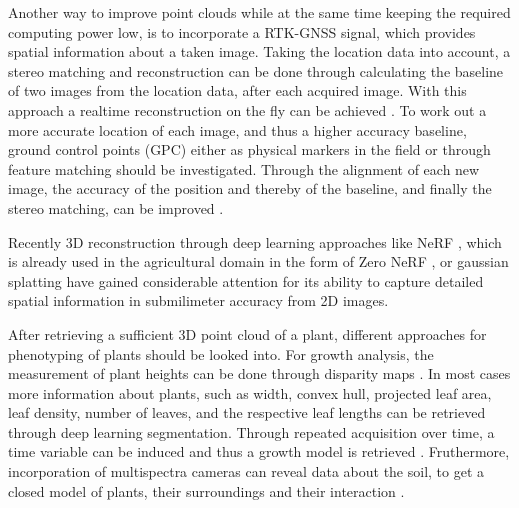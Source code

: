 \documentclass[conference,]{IEEEtran}
\begin{document}
Another way to improve point clouds while at the same time keeping the
required computing power low, is to incorporate a RTK-GNSS signal, which
provides spatial information about a taken image. Taking the location
data into account, a stereo matching and reconstruction can be done
through calculating the baseline of two images from the location data,
after each acquired image. With this approach a realtime reconstruction
on the fly can be achieved \autocite{hasheminasab2020,matsuura2023}. To
work out a more accurate location of each image, and thus a higher
accuracy baseline, ground control points (GPC) either as physical
markers in the field or through feature matching should be investigated.
Through the alignment of each new image, the accuracy of the position
and thereby of the baseline, and finally the stereo matching, can be
improved \autocite{feng2023}.

Recently 3D reconstruction through deep learning approaches like NeRF
\autocite{gao}, which is already used in the agricultural domain in the
form of Zero NeRF \autocite{peat2022}, or gaussian splatting
\autocite{kerbl} have gained considerable attention for its ability to
capture detailed spatial information in submilimeter accuracy from 2D
images.

After retrieving a sufficient 3D point cloud of a plant, different
approaches for phenotyping of plants should be looked into. For growth
analysis, the measurement of plant heights can be done through disparity
maps \autocite{matsuura2023}. In most cases more information about
plants, such as width, convex hull, projected leaf area, leaf density,
number of leaves, and the respective leaf lengths can be retrieved
through deep learning segmentation. Through repeated acquisition over
time, a time variable can be induced and thus a growth model is
retrieved \autocite{paulus2019,li2022}. Fruthermore, incorporation of
multispectra cameras can reveal data about the soil, to get a closed
model of plants, their surroundings and their interaction
\autocite{günder2022}.

\newpage

\printbibliography[title=References]
\end{document}
